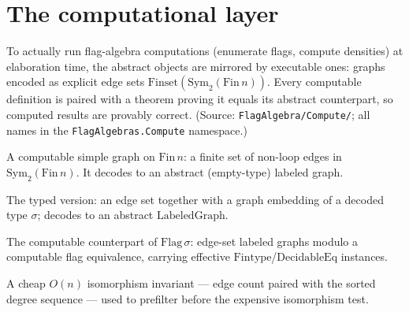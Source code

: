 \chapter{The computational layer}
\label{chap:compute}

To actually run flag-algebra computations (enumerate flags, compute densities) at
elaboration time, the abstract objects are mirrored by executable ones: graphs
encoded as explicit edge sets $\mathrm{Finset}(\mathrm{Sym}_2(\mathrm{Fin}\,n))$.
Every computable definition is paired with a theorem proving it equals its
abstract counterpart, so computed results are provably correct. (Source:
\texttt{FlagAlgebra/Compute/}; all names in the \texttt{FlagAlgebras.Compute}
namespace.)

\begin{definition}
  \label{def:sym2-graph}
  \leanok
  A computable simple graph on $\mathrm{Fin}\,n$: a finite set of non-loop edges
  in $\mathrm{Sym}_2(\mathrm{Fin}\,n)$. It decodes to an abstract
  (empty-type) labeled graph.
\end{definition}

\begin{definition}
  \label{def:sym2-labeled-graph}
  \leanok
  The typed version: an edge set together with a graph embedding of a decoded
  type $\sigma$; decodes to an abstract $\mathrm{LabeledGraph}$.
\end{definition}

\begin{definition}
  \label{def:sym2-flag}
  \leanok
  The computable counterpart of $\mathrm{Flag}\,\sigma$: edge-set labeled graphs
  modulo a computable flag equivalence, carrying effective
  $\mathrm{Fintype}$/$\mathrm{DecidableEq}$ instances.
\end{definition}

\begin{definition}
  \label{def:deg-key}
  \leanok
  A cheap $O(n)$ isomorphism invariant --- edge count paired with the sorted
  degree sequence --- used to prefilter before the expensive isomorphism test.
\end{definition}

